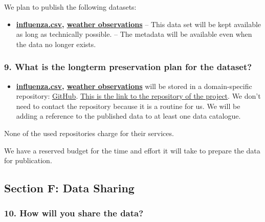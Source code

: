 \documentclass[
]{article}
\providecommand{\tightlist}{%
  \setlength{\itemsep}{0pt}\setlength{\parskip}{0pt}}
\begin{document}
We plan to publish the following datasets:

\begin{itemize}
\tightlist
\item
  \textbf{\href{https://www.data.gv.at/katalog/dataset/grippemeldedienst-stadt-wien}{influenza.csv}, \href{https://www.meteoblue.com/en/weather/archive/export/vienna_austria_2761369}{weather observations}} {--} This data set will
  be kept available as long as technically possible. {--} The metadata
  will be available even when the data no longer exists.
\end{itemize}

\hypertarget{q-longterm-plan}{}
\hypertarget{what-is-the-longterm-preservation-plan-for-the-dataset}{%
\subsubsection{9. What is the longterm preservation plan for the
dataset?}\label{what-is-the-longterm-preservation-plan-for-the-dataset}}

\begin{itemize}
\tightlist
\item
  \textbf{\href{https://www.data.gv.at/katalog/dataset/grippemeldedienst-stadt-wien}{influenza.csv}, \href{https://www.meteoblue.com/en/weather/archive/export/vienna_austria_2761369}{weather observations}} will be stored in a
  domain-specific repository:
  \href{https://fairsharing.org/bsg-d001160}{GitHub}. \href{https://github.com/hudcondr/data-stewardship-ex1}{This is the link to the repository of the project}. We don't need to
  contact the repository because it is a routine for us. We will be
  adding a reference to the published data to at least one data
  catalogue.
\end{itemize}

None of the used repositories charge for their services.

We have a reserved budget for the time and effort it will take to
prepare the data for publication.

\hypertarget{sec-data-sharing}{}
\hypertarget{section-f-data-sharing}{%
\subsection{Section F: Data Sharing}\label{section-f-data-sharing}}

\hypertarget{q-how-share}{}
\hypertarget{how-will-you-share-the-data}{%
\subsubsection{10. How will you share the
data?}\label{how-will-you-share-the-data}}
\end{document}
